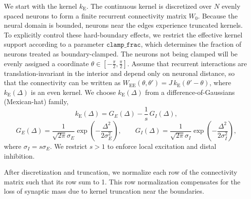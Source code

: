\documentclass{article}
\newcommand{\WEE}{W_{\text{EE}}}
\newcommand{\kE}{k_{\text{E}}}
\newcommand{\neuralspace}{[-\frac\pi2,\frac\pi2]}
\begin{document}
We start with the kernel $\kE$. The continuous kernel is discretized over $N$ evenly spaced neurons to form a finite recurrent connectivity matrix $W_0$. Because the neural domain is bounded, neurons near the edges experience truncated kernels. To explicitly control these hard-boundary effects, we restrict the effective kernel support according to a parameter $\texttt{clamp\_frac}$, which determines the fraction of neurons treated as boundary-clamped. The neurons not being clamped will be evenly assigned a coordinate $\theta \in \neuralspace$. Assume that recurrent interactions are translation-invariant in the interior and depend only on neuronal distance, so that the connectivity can be written as $\WEE(\theta,\theta') = J\,\kE(\theta'-\theta)$, where $\kE(\Delta)$ is an even kernel. We choose $\kE(\Delta)$ from a difference-of-Gaussians (Mexican-hat) family,
\begin{equation}
\kE(\Delta) = G_E(\Delta) - \frac{1}{s}\,G_I(\Delta),
\end{equation}
\begin{equation}
G_E(\Delta) = \frac{1}{\sqrt{2\pi}\sigma_E}
\exp\!\left(-\frac{\Delta^2}{2\sigma_E^2}\right),
\qquad
G_I(\Delta) = \frac{1}{\sqrt{2\pi}\sigma_I}
\exp\!\left(-\frac{\Delta^2}{2\sigma_I^2}\right),
\end{equation}
where $\sigma_I = s\sigma_E$. We restrict $s>1$ to enforce local excitation and distal inhibition.

After discretization and truncation, we normalize each row of the connectivity matrix such that its row sum to 1. This row normalization compensates for the loss of synaptic mass due to kernel truncation near the boundaries. 
\end{document}
